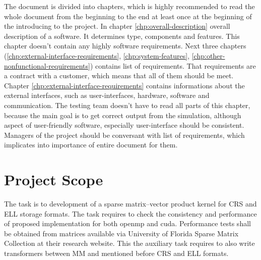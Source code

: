 	The document is divided into chapters, which is highly recommended to read the whole document from the beginning to the end at least once at the beginning of the introducing to the project. In chapter \ref{chp:overall-description} overall description of a software. It determines type, components and features. This chapter doesn't contain any highly software requirements. Next three chapters (\ref{chp:external-interface-requirements}, \ref{chp:system-features}, \ref{chp:other-nonfunctional-requirements}) contains list of requirements. That requirements are a contract with a customer, which means that all of them should be meet. Chapter \ref{chp:external-interface-requirements} contains informations about the external interfaces, such as user-interfaces, hardware, software and communication. The testing team doesn't have to read all parts of this chapter, because the main goal is to get correct output from the simulation, although aspect of user-friendly software, especially user-interface should be consistent. Managers of the project should be conversant with list of requirements, which implicates into importance of entire document for them. 	
\section{Project Scope}
	\begin{comment}
		$<$Provide a short description of the software being specified and its purpose, 
		including relevant benefits, objectives, and goals. Relate the software to 
		corporate goals or business strategies. If a separate vision and scope document 
		is available, refer to it rather than duplicating its contents here.$>$
	\end{comment}
	The task is to development of a sparse matrix--vector product kernel for \gls{CRS} and \gls{ELL} storage formats. The task requires to check the consistency and performance of proposed implementation for both \gls{openmp} and \gls{cuda}. Performance tests shall be obtained from matrices available via University of Florida Sparse Matrix Collection at their research website. This the auxiliary task requires to also write transformers between \gls{MM} and mentioned before \gls{CRS} and \gls{ELL} formats.
